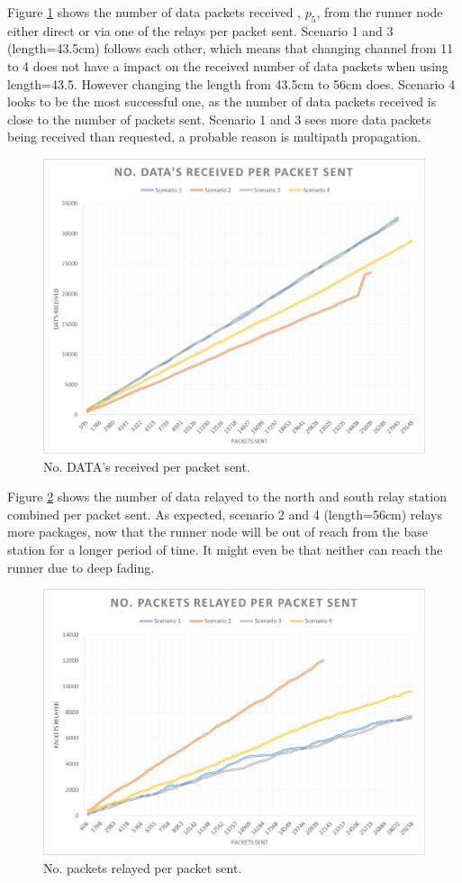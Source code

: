 \noindent Figure \ref{fig:nodatareceived} shows the number of data packets received , $p_5$, from the runner node either direct or via one of the relays per packet sent. Scenario 1 and 3 (length=43.5cm) follows each other, which means that changing channel from 11 to 4 does not have a impact on the received number of data packets when using length=43.5. However changing the length from 43.5cm to 56cm does. Scenario 4 looks to be the most successful one, as the number of data packets received is close to the number of packets sent. Scenario 1 and 3 sees more data packets being received than requested, a probable reason is multipath propagation.

\begin{figure}[H]
	\centering
	\includegraphics[width=0.8\linewidth]{results/NoDataReceived}
	\caption{No. DATA's received per packet sent.}
	\label{fig:nodatareceived}
\end{figure}

\noindent Figure \ref{fig:nopacketsrelayed} shows the number of data relayed to the north  and south relay station combined per packet sent. As expected, scenario 2 and 4 (length=56cm) relays more packages, now that the runner node will be out of reach from the base station for a longer period of time. It might even be that neither can reach the runner due to deep fading.

\begin{figure}[H]
	\centering
	\includegraphics[width=0.8\linewidth]{results/NoPacketsRelayed}
	\caption{No. packets relayed per packet sent.}
	\label{fig:nopacketsrelayed}
\end{figure}

